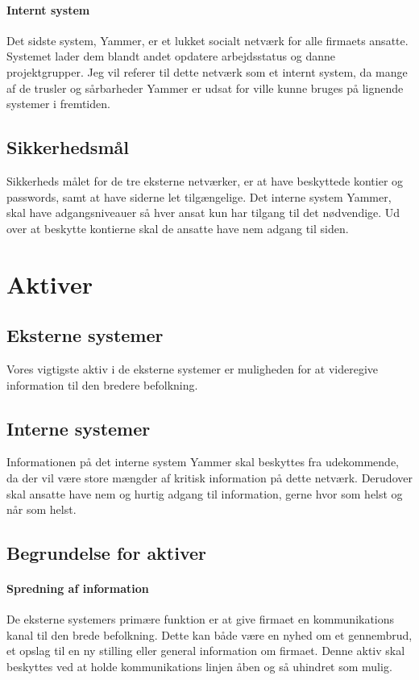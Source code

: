 \documentclass{article}
\begin{document}
\paragraph{Internt system}
Det sidste system, Yammer, er et lukket socialt netværk for alle firmaets ansatte. Systemet lader dem blandt andet opdatere arbejdsstatus og danne projektgrupper. Jeg vil referer til dette netværk som et internt system, da mange af de trusler og sårbarheder Yammer er udsat for ville kunne bruges på lignende systemer i fremtiden.

\subsection{Sikkerhedsmål}

Sikkerheds målet for de tre eksterne netværker, er at have beskyttede kontier og passwords,
samt at have siderne let tilgængelige. Det interne system Yammer, skal have adgangsniveauer
så hver ansat kun har tilgang til det nødvendige. Ud over at beskytte kontierne skal de ansatte
have nem adgang til siden.

\section{Aktiver}
\subsection{Eksterne systemer}
Vores vigtigste aktiv i de eksterne systemer er muligheden for at videregive information til den bredere befolkning. 

\subsection{Interne systemer}
Informationen på det interne system Yammer skal beskyttes fra udekommende, da der vil være store mængder af kritisk information på dette netværk. Derudover skal ansatte have nem og hurtig adgang til information, gerne hvor som helst og når som helst.

\subsection{Begrundelse for aktiver}

\paragraph{Spredning af information}
De eksterne systemers primære funktion er at give firmaet en kommunikations kanal til den brede befolkning. Dette kan både være en nyhed om et gennembrud, et opslag til en ny stilling eller general information om firmaet. Denne aktiv skal beskyttes ved at holde kommunikations linjen åben og så uhindret som mulig.
\end{document}
